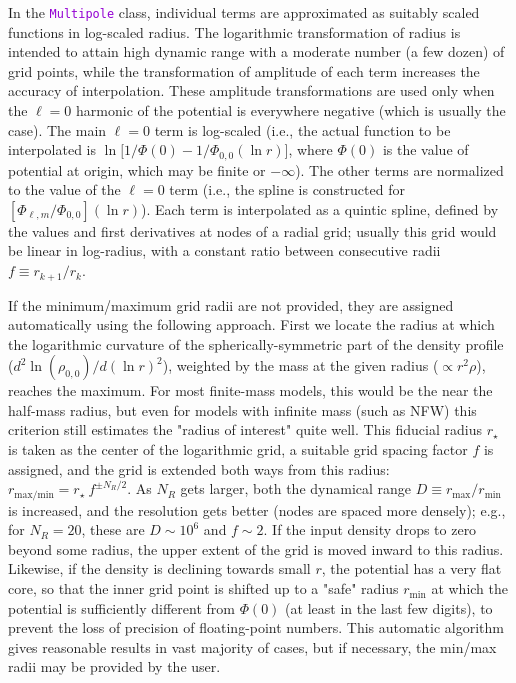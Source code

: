 \documentclass[12pt]{article}
\newcommand{\ttt}[1]{\textcolor{darkviolet}{\texttt{#1}}}
\begin{document}
In the \ttt{Multipole} class, individual terms are approximated as suitably scaled functions in log-scaled radius. The logarithmic transformation of radius is intended to attain high dynamic range with a moderate number (a few dozen) of grid points, while the transformation of amplitude of each term increases the accuracy of interpolation. These amplitude transformations are used only when the $\ell=0$ harmonic of the potential is everywhere negative (which is usually the case). The main $\ell=0$ term is log-scaled (i.e., the actual function to be interpolated is $\ln\big[1/\Phi(0)-1/\Phi_{0,0}(\ln r)\big]$, where $\Phi(0)$ is the value of potential at origin, which may be finite or $-\infty$). The other terms are normalized to the value of the $\ell=0$ term (i.e., the spline is constructed for $[\Phi_{\ell,m}/\Phi_{0,0}](\ln r)$). Each term is interpolated as a quintic spline, defined by the values and first derivatives at nodes of a radial grid; usually this grid would be linear in log-radius, with a constant ratio between consecutive radii $f\equiv r_{k+1}/r_k$.

If the minimum/maximum grid radii are not provided, they are assigned automatically using the following approach. First we locate the radius at which the logarithmic curvature of the spherically-symmetric part of the density profile ($d^2\ln(\rho_{0,0})/d(\ln r)^2$), weighted by the mass at the given radius ($\propto r^2\rho$), reaches the maximum. For most finite-mass models, this would be the near the half-mass radius, but even for models with infinite mass (such as NFW) this criterion still estimates the "radius of interest" quite well. This fiducial radius $r_\star$ is taken as the center of the logarithmic grid, a suitable grid spacing factor $f$ is assigned, and the grid is extended both ways from this radius: $r_\mathrm{max/min} = r_\star\: f^{\pm N_R/2}$. As $N_R$ gets larger, both the dynamical range $D\equiv r_\mathrm{max}/r_\mathrm{min}$ is increased, and the resolution gets better (nodes are spaced more densely); e.g., for $N_R=20$, these are $D\sim 10^6$ and $f\sim 2$. If the input density drops to zero beyond some radius, the upper extent of the grid is moved inward to this radius. Likewise, if the density is declining towards small $r$, the potential has a very flat core, so that the inner grid point is shifted up to a "safe" radius $r_\mathrm{min}$ at which the potential is sufficiently different from $\Phi(0)$ (at least in the last few digits), to prevent the loss of precision of floating-point numbers. This automatic algorithm gives reasonable results in vast majority of cases, but if necessary, the min/max radii may be provided by the user.
\end{document}
